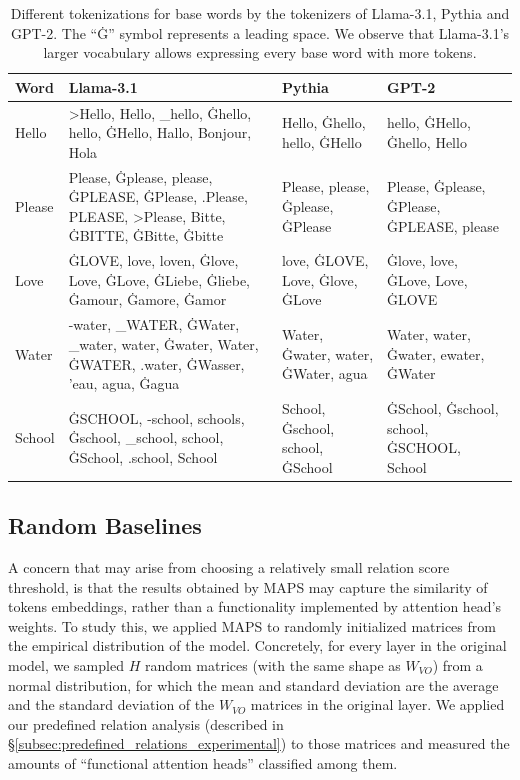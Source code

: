 \documentclass[11pt]{article}
\newcommand{\llama}{Llama-3.1}
\newcommand{\Pythia}{Pythia}
\newcommand{\GPT}{GPT-2}
\newcommand{\framework}{\textsc{MAPS}}
\begin{document}
\begin{table}[htbp]
\centering
\footnotesize
\renewcommand{\arraystretch}{1.5}
\begin{tabularx}{\textwidth}{lXXX}
\toprule
Word & \llama{} & \Pythia{} & \GPT{} \\
\midrule
Hello & >Hello, Hello, \_hello, Ġhello, hello, ĠHello, Hallo, Bonjour, Hola & Hello, Ġhello, hello, ĠHello & hello, ĠHello, Ġhello, Hello \\
Please & Please, Ġplease, please, ĠPLEASE, ĠPlease, .Please, PLEASE, >Please, Bitte, ĠBITTE, ĠBitte, Ġbitte & Please, please, Ġplease, ĠPlease & Please, Ġplease, ĠPlease, ĠPLEASE, please \\
Love & ĠLOVE, love, loven, Ġlove, Love, ĠLove, ĠLiebe, Ġliebe, Ġamour, Ġamore, Ġamor & love, ĠLOVE, Love, Ġlove, ĠLove & Ġlove, love, ĠLove, Love, ĠLOVE \\
Water & -water, \_WATER, ĠWater, \_water, water, Ġwater, Water, ĠWATER, .water, ĠWasser, 'eau, agua, Ġagua & Water, Ġwater, water, ĠWater, agua & Water, water, Ġwater, ewater, ĠWater \\
School & ĠSCHOOL, -school, schools, Ġschool, \_school, school, ĠSchool, .school, School & School, Ġschool, school, ĠSchool & ĠSchool, Ġschool, school, ĠSCHOOL, School \\
\bottomrule
\end{tabularx}
\caption{Different tokenizations for base words by the tokenizers of \llama{}, \Pythia{} and \GPT{}. The ``Ġ'' symbol represents a leading space. We observe that \llama{}'s larger vocabulary allows expressing every base word with more tokens.}
\label{tab:tokenization_llama}
\end{table}



\subsection{Random Baselines}
A concern that may arise from choosing a relatively small relation score threshold, is that the results obtained by \framework{} may capture the similarity of tokens embeddings, rather than a functionality implemented by attention head's weights. 
To study this, we applied \framework{} to randomly initialized matrices from the empirical distribution of the model.
Concretely, for every layer in the original model, we sampled $H$ random matrices (with the same shape as $W_{VO}$) from a normal distribution, for which the mean and standard deviation are the average and the standard deviation of the $W_{VO}$ matrices in the original layer. We applied our predefined relation analysis (described in \S\ref{subsec:predefined_relations_experimental}) to those matrices and measured the amounts of ``functional attention heads'' classified among them.
\end{document}
